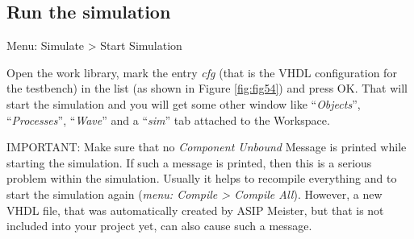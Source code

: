 \hypertarget{run-the-simulation}{%
\subsection{Run the simulation}\label{run-the-simulation}}

Menu: Simulate \textgreater{} Start Simulation

Open the work library, mark the entry \emph{cfg} (that is the VHDL
configuration for the testbench) in the list (as shown in Figure \ref{fig:fig54}) and press OK. That will start the
simulation and you will get some other window like ``\emph{Objects}'',
``\emph{Processes}'', ``\emph{Wave}'' and a ``\emph{sim}'' tab attached
to the Workspace.

IMPORTANT: Make sure that no \emph{Component Unbound} Message is printed
while starting the simulation. If such a message is printed, then this
is a serious problem within the simulation. Usually it helps to
recompile everything and to start the simulation again (\emph{menu:
Compile \textgreater{} Compile All}). However, a new VHDL file, that was
automatically created by ASIP Meister, but that is not included into
your project yet, can also cause such a message.

